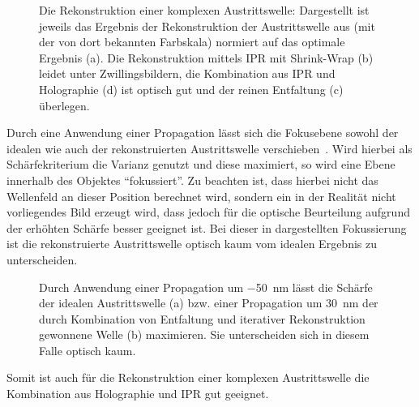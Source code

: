 \begin{figure}
	\centering
	\caption[Rekonstruktion einer Austrittswelle]{Die Rekonstruktion einer komplexen Austrittswelle: Dargestellt ist jeweils das Ergebnis der Rekonstruktion der Austrittswelle aus  (mit der von dort bekannten Farbskala) normiert auf das optimale Ergebnis (a). Die Rekonstruktion mittels IPR mit Shrink-Wrap (b) leidet unter Zwillingsbildern, die Kombination aus IPR und Holographie (d) ist optisch gut und der reinen Entfaltung (c) überlegen.}
	\label{fig:recon3d}
\end{figure}

Durch eine Anwendung einer Propagation lässt sich die Fokusebene sowohl der idealen wie auch der rekonstruierten Austrittswelle verschieben~\cite{ulmer2015}. Wird hierbei als Schärfekriterium die Varianz genutzt und diese maximiert, so wird eine Ebene innerhalb des Objektes "`fokussiert"'. Zu beachten ist, dass hierbei nicht das Wellenfeld an dieser Position berechnet wird, sondern ein in der Realität nicht vorliegendes Bild erzeugt wird, dass jedoch für die optische Beurteilung aufgrund der erhöhten Schärfe besser geeignet ist.  Bei dieser in  dargestellten Fokussierung ist die rekonstruierte Austrittswelle optisch kaum vom idealen Ergebnis zu unterscheiden.

\begin{figure}
	\centering
	\caption[Propagation der Austrittswelle]{Durch Anwendung einer Propagation um \SI{-50}{nm}  lässt die Schärfe der idealen Austrittswelle (a) bzw. einer Propagation um \SI{30}{nm} der durch Kombination von Entfaltung und iterativer Rekonstruktion gewonnene Welle (b) maximieren. Sie unterscheiden sich in diesem Falle optisch kaum.}
	\label{fig:recon_focus}
\end{figure}

Somit ist auch für die Rekonstruktion einer komplexen Austrittswelle die Kombination aus Holographie und IPR gut geeignet.